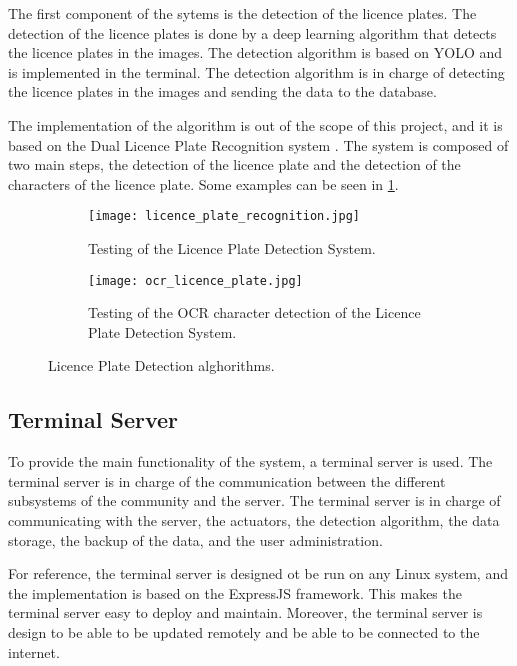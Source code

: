 The first component of the sytems is the detection of the licence plates. The detection of the licence plates is done by a deep learning algorithm that detects the licence plates in the images. The detection algorithm is based on YOLO \autocite{yolov8_ultralytics} and is implemented in the terminal. The detection algorithm is in charge of detecting the licence plates in the images and sending the data to the database.

The implementation of the algorithm is out of the scope of this project, and it is based on the Dual Licence Plate Recognition system \autocite{RAMAJOBALLESTER2024104608}. The system is composed of two main steps, the detection of the licence plate and the detection of the characters of the licence plate. Some examples can be seen in \cref{fig:licence_plate_detection}.

\begin{figure}
	\begin{subfigure}{0.95\textwidth}
		\texttt{[image: licence\_plate\_recognition.jpg]}
		\caption{Testing of the Licence Plate Detection System. \autocite{RAMAJOBALLESTER2024104608}}
	\end{subfigure}
	\br
	\begin{subfigure}{0.95\textwidth}
		\texttt{[image: ocr\_licence\_plate.jpg]}
		\caption{Testing of the OCR character detection of the Licence Plate Detection System. \autocite{RAMAJOBALLESTER2024104608}}
	\end{subfigure}

	\caption{Licence Plate Detection alghorithms. \autocite{RAMAJOBALLESTER2024104608}}\label{fig:licence_plate_detection}
\end{figure}

\subsection{Terminal Server}

To provide the main functionality of the system, a terminal server is used. The terminal server is in charge of the communication between the different subsystems of the community and the server. The terminal server is in charge of communicating with the server, the actuators, the detection algorithm, the data storage, the backup of the data, and the user administration.

For reference, the terminal server is designed ot be run on any Linux system, and the implementation is based on the ExpressJS framework. This makes the terminal server easy to deploy and maintain. Moreover, the terminal server is design to be able to be updated remotely and be able to be connected to the internet.


